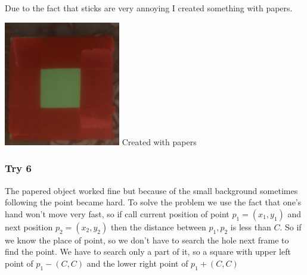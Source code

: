 \documentclass{report}
\begin{document}
Due to the fact that sticks are very annoying I created something with papers.
\begin{center}
	\includegraphics[width=2in]{Object6.jpg} \newline
	\figurename{Created with papers}
\end{center}

\subsubsection{Try 6}
The papered object worked fine but because of the small background sometimes following the point became hard. To solve the problem we use the fact that one's hand won't move very fast, so if call current position of point $p_1 = (x_1, y_1)$ and next position $p_2 = (x_2, y_2)$ then the distance between $p_1, p_2$ is less than $C$. So if we know the place of point, so we don't have to search the hole next frame to find the point. We have to search only a part of it, so a square with upper left point of $p_1 - (C, C)$ and the lower right point of $p_1 + (C, C)$ 
\end{document}
